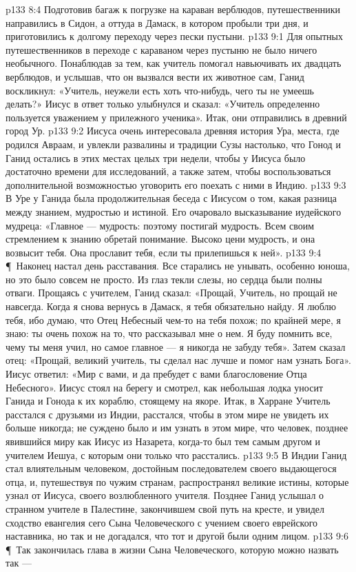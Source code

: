 \vs p133 8:4 Подготовив багаж к погрузке на караван верблюдов, путешественники направились в Сидон, а оттуда в Дамаск, в котором пробыли три дня, и приготовились к долгому переходу через пески пустыни.
\vs p133 9:1 Для опытных путешественников в переходе с караваном через пустыню не было ничего необычного. Понаблюдав за тем, как учитель помогал навьючивать их двадцать верблюдов, и услышав, что он вызвался вести их животное сам, Ганид воскликнул: «Учитель, неужели есть хоть что\hyp{}нибудь, чего ты не умеешь делать?» Иисус в ответ только улыбнулся и сказал: «Учитель определенно пользуется уважением у прилежного ученика». Итак, они отправились в древний город Ур.
\vs p133 9:2 Иисуса очень интересовала древняя история Ура, места, где родился Авраам, и увлекли развалины и традиции Сузы настолько, что Гонод и Ганид остались в этих местах целых три недели, чтобы у Иисуса было достаточно времени для исследований, а также затем, чтобы воспользоваться дополнительной возможностью уговорить его поехать с ними в Индию.
\vs p133 9:3 В Уре у Ганида была продолжительная беседа с Иисусом о том, какая разница между знанием, мудростью и истиной. Его очаровало высказывание иудейского мудреца: «Главное --- мудрость: поэтому постигай мудрость. Всем своим стремлением к знанию обретай понимание. Высоко цени мудрость, и она возвысит тебя. Она прославит тебя, если ты прилепишься к ней».
\vs p133 9:4 \P\ Наконец настал день расставания. Все старались не унывать, особенно юноша, но это было совсем не просто. Из глаз текли слезы, но сердца были полны отваги. Прощаясь с учителем, Ганид сказал: «Прощай, Учитель, но прощай не навсегда. Когда я снова вернусь в Дамаск, я тебя обязательно найду. Я люблю тебя, ибо думаю, что Отец Небесный чем\hyp{}то на тебя похож; по крайней мере, я знаю: ты очень похож на то, что рассказывал мне о нем. Я буду помнить все, чему ты меня учил, но самое главное --- я никогда не забуду тебя». Затем сказал отец: «Прощай, великий учитель, ты сделал нас лучше и помог нам узнать Бога». Иисус ответил: «Мир с вами, и да пребудет с вами благословение Отца Небесного». Иисус стоял на берегу и смотрел, как небольшая лодка уносит Ганида и Гонода к их кораблю, стоящему на якоре. Итак, в Харране Учитель расстался с друзьями из Индии, расстался, чтобы в этом мире не увидеть их больше никогда; не суждено было и им узнать в этом мире, что человек, позднее явившийся миру как Иисус из Назарета, когда\hyp{}то был тем самым другом и учителем Иешуа, с которым они только что расстались.
\vs p133 9:5 В Индии Ганид стал влиятельным человеком, достойным последователем своего выдающегося отца, и, путешествуя по чужим странам, распространял великие истины, которые узнал от Иисуса, своего возлюбленного учителя. Позднее Ганид услышал о странном учителе в Палестине, закончившем свой путь на кресте, и увидел сходство евангелия сего Сына Человеческого с учением своего еврейского наставника, но так и не догадался, что тот и другой были одним лицом.
\vs p133 9:6 \P\ Так закончилась глава в жизни Сына Человеческого, которую можно назвать так --- 
